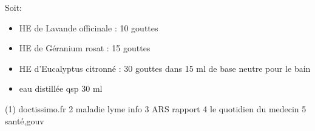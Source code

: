 \documentclass[12pt,a4wide]{article}
\begin{document}
Soit:
\begin{itemize}
\item HE de Lavande officinale : 10 gouttes
\item HE de Géranium rosat : 15 gouttes
\item HE d'Eucalyptus citronné : 30 gouttes dans 15 ml de base neutre pour le bain
\item eau distillée qsp 30 ml
\end{itemize}









(1) doctissimo.fr
2 maladie lyme info
3 ARS rapport
4 le quotidien du medecin
5 santé,gouv
\end{document}
